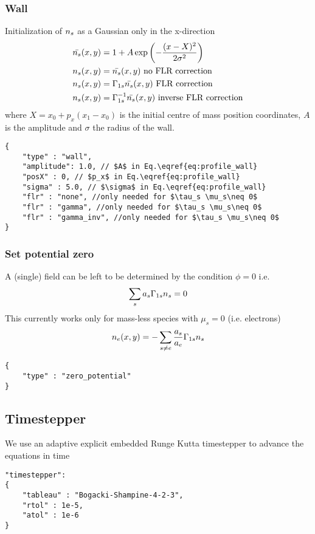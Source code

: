 \subsubsection{Wall}
Initialization of ${n_s} $ as a Gaussian only in the x-direction
\begin{align} \label{eq:profile_wall}
    \bar {{n_s} }(x,y) &= 1 + A\exp\left( -\frac{(x-X)^2 }{2\sigma^2}\right) \\
    {n_s} (x,y) &= \bar {{n_s} }(x,y) \text{ no FLR correction} \\
    {n_s} (x,y) &= \Gamma_{1s}\bar {{n_s} }(x,y) \text{ FLR correction} \\
    {n_s} (x,y) &= \Gamma_{1s}^{-1}\bar {{n_s} }(x,y) \text{ inverse FLR correction} \\
\end{align}
where $X = x_0 + p_x (x_1 - x_0)$ is the initial centre of mass position coordinates, $A$ is the amplitude and $\sigma$ the
radius of the wall.
\begin{verbatim}
{
    "type" : "wall",
    "amplitude": 1.0, // $A$ in Eq.\eqref{eq:profile_wall}
    "posX" : 0, // $p_x$ in Eq.\eqref{eq:profile_wall}
    "sigma" : 5.0, // $\sigma$ in Eq.\eqref{eq:profile_wall}
    "flr" : "none", //only needed for $\tau_s \mu_s\neq 0$
    "flr" : "gamma", //only needed for $\tau_s \mu_s\neq 0$
    "flr" : "gamma_inv", //only needed for $\tau_s \mu_s\neq 0$
}
\end{verbatim}

\subsubsection{ Set potential zero}
A (single) field can be left to be determined by the condition $\phi = 0$ i.e.
\begin{align}
    \sum_s a_s \Gamma_{1s} {n_s}  = 0
\end{align}
This currently works only for mass-less species with $\mu_s =0$ (i.e. electrons)
\begin{align}
    n_e(x,y) = -\sum_{s\neq e} \frac{a_s}{a_e} \Gamma_{1s}{n_s} 
\end{align}
\begin{verbatim}
{
    "type" : "zero_potential"
}
\end{verbatim}
\subsection{Timestepper}
We use an adaptive explicit embedded Runge Kutta timestepper to advance the equations in time
\begin{verbatim}
"timestepper":
{
    "tableau" : "Bogacki-Shampine-4-2-3",
    "rtol" : 1e-5,
    "atol" : 1e-6
}
\end{verbatim}



